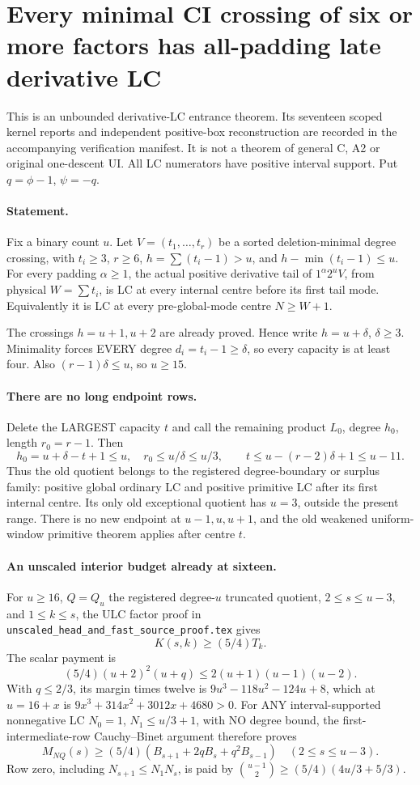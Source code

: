 \section{Every minimal CI crossing of six or more factors has all-padding late derivative LC}
This is an unbounded derivative-LC entrance theorem. Its seventeen
scoped kernel reports and independent positive-box reconstruction
are recorded in the accompanying verification manifest.
It is not a theorem of general C, A2 or original one-descent UI.
All LC numerators have positive interval support. Put
$q=\phi-1$, $\psi=-q$.

\paragraph{Statement.}
Fix a binary count $u$. Let $V=(t_1,\ldots,t_r)$ be a sorted
deletion-minimal degree crossing, with $t_i\ge3$, $r\ge6$,
$h=\sum(t_i-1)>u$, and $h-\min(t_i-1)\le u$.
For every padding $\alpha\ge1$, the actual positive derivative
tail of $1^\alpha2^uV$, from physical $W=\sum t_i$, is LC
at every internal centre before its first tail mode.
Equivalently it is LC at every pre-global-mode centre $N\ge W+1$.

The crossings $h=u+1,u+2$ are already proved. Hence write
$h=u+\delta$, $\delta\ge3$. Minimality forces EVERY degree
$d_i=t_i-1\ge\delta$, so every capacity is at least four.
Also $(r-1)\delta\le u$, so $u\ge15$.

\paragraph{There are no long endpoint rows.}
Delete the LARGEST capacity $t$ and call the remaining product $L_0$,
degree $h_0$, length $r_0=r-1$. Then
\[
 h_0=u+\delta-t+1\le u,\quad r_0\le u/\delta\le u/3,
 \qquad t\le u-(r-2)\delta+1\le u-11.              \tag{1}
\]
Thus the old quotient belongs to the registered degree-boundary or
surplus family: positive global ordinary LC and positive primitive
LC after its first internal centre. Its only old exceptional quotient
has $u=3$, outside the present range. There is no new endpoint at
$u-1,u,u+1$, and the old weakened uniform-window primitive theorem
applies after centre $t$.

\paragraph{An unscaled interior budget already at sixteen.}
For $u\ge16$, $Q=Q_u$ the registered degree-$u$ truncated quotient,
$2\le s\le u-3$, and $1\le k\le s$, the ULC factor proof in
\texttt{unscaled\_head\_and\_fast\_source\_proof.tex} gives
\[
 K(s,k)\ge(5/4)T_k.
\]
The scalar payment is
\[
 (5/4)(u+2)^2(u+q)\le2(u+1)(u-1)(u-2).
\]
With $q\le2/3$, its margin times twelve is
$9u^3-118u^2-124u+8$, which at $u=16+x$ is
$9x^3+314x^2+3012x+4680>0$.
For ANY interval-supported nonnegative LC $N_0=1$,
$N_1\le u/3+1$, with NO degree bound, the first-intermediate-row
Cauchy--Binet argument therefore proves
\[
 M_{NQ}(s)\ge(5/4)
       (B_{s+1}+2qB_s+q^2B_{s-1})\quad(2\le s\le u-3).
                                                               \tag{2}
\]
Row zero, including $N_{s+1}\le N_1N_s$, is paid by
$\binom{u-1}{2}\ge(5/4)(4u/3+5/3)$.

